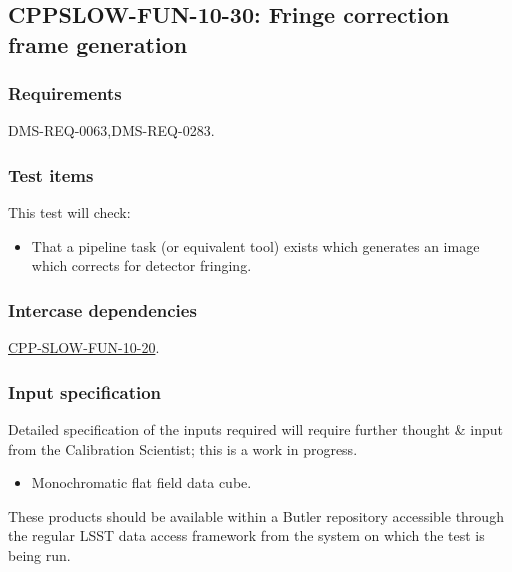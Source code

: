 \subsection{CPPSLOW-FUN-10-30: Fringe correction frame generation}
\label{cppslow-fun-10-30}

\subsubsection{Requirements}

DMS-REQ-0063,DMS-REQ-0283.

\subsubsection{Test items}

This test will check:

\begin{itemize}

  \item{That a pipeline task (or equivalent tool) exists which generates an
  image which corrects for detector fringing.}

\end{itemize}

\subsubsection{Intercase dependencies}

\hyperref[cppslow-fun-10-20]{CPP-SLOW-FUN-10-20}.

\subsubsection{Input specification}

\begin{note}
Detailed specification of the inputs required will require further thought \&
input from the Calibration Scientist; this is a work in progress.
\end{note}

\begin{itemize}

  \item{Monochromatic flat field data cube.}

\end{itemize}

These products should be available within a Butler repository accessible
through the regular LSST data access framework from the system on which the test
is being run.

